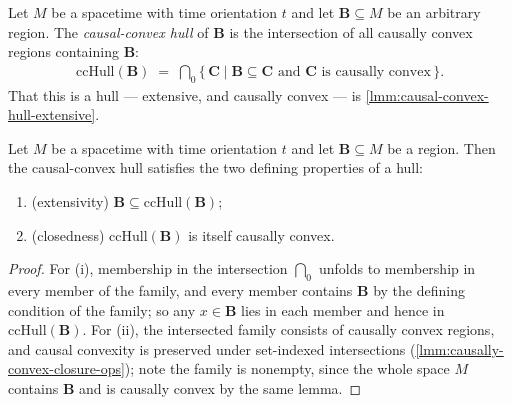 \medskip

\begin{definition}
    \label{def:causal-convex-hull}
    \leanok
    Let $M$ be a spacetime with time orientation $t$ and let $\mathbf{B} \subseteq M$ be an arbitrary region. The \emph{causal-convex hull} of $\mathbf{B}$ is the intersection of all causally convex regions containing $\mathbf{B}$:
    \begin{align}
        \mathrm{ccHull}(\mathbf{B}) \;=\; \bigcap_0 \{\, \mathbf{C} \mid \mathbf{B} \subseteq \mathbf{C} \text{ and } \mathbf{C} \text{ is causally convex} \,\}.
    \end{align}
    That this is a hull --- extensive, and causally convex --- is \ref{lmm:causal-convex-hull-extensive}.
\end{definition}

\medskip

\begin{lemma}
    \label{lmm:causal-convex-hull-extensive}
    \leanok
    Let $M$ be a spacetime with time orientation $t$ and let $\mathbf{B} \subseteq M$ be a region. Then the causal-convex hull satisfies the two defining properties of a hull:
    \begin{enumerate}
        \item (extensivity) $\mathbf{B} \subseteq \mathrm{ccHull}(\mathbf{B})$;
        \item (closedness) $\mathrm{ccHull}(\mathbf{B})$ is itself causally convex.
    \end{enumerate}
\end{lemma}
\begin{proof}
    \leanok
    For (i), membership in the intersection $\bigcap_0$ unfolds to membership in every member of the family, and every member contains $\mathbf{B}$ by the defining condition of the family; so any $x \in \mathbf{B}$ lies in each member and hence in $\mathrm{ccHull}(\mathbf{B})$. For (ii), the intersected family consists of causally convex regions, and causal convexity is preserved under set-indexed intersections (\ref{lmm:causally-convex-closure-ops}); note the family is nonempty, since the whole space $M$ contains $\mathbf{B}$ and is causally convex by the same lemma.
\end{proof}


